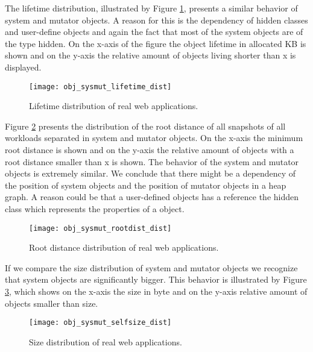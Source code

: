 The lifetime distribution, illustrated by Figure \ref{fig:obj_sysmut_lieftiem_dist}, presents a similar behavior of system and mutator objects. A reason for this is the dependency of hidden classes and user-define objects and again the fact that most of the system objects are of the type hidden. On the x-axis of the figure the object lifetime in allocated KB is shown and on the y-axis the relative amount of objects living shorter than x is displayed. 
\begin{figure}
	\centering
	\texttt{[image: obj\_sysmut\_lifetime\_dist]}
	\caption{Lifetime distribution of real web applications.}
	\label{fig:obj_sysmut_lieftiem_dist}
\end{figure}

Figure \ref{fig:obj_sysmut_rootdist_dist} presents the distribution of the root distance of all snapshots of all workloads separated in system and mutator objects. On the x-axis the minimum root distance is shown and on the y-axis the relative amount of objects with a root distance smaller than x is shown. The behavior of the system and mutator objects is extremely similar. We conclude that there might be a dependency of the position of system objects and the position of mutator objects in a heap graph. A reason could be that a user-defined objects has a reference the hidden class which represents the properties of a object.  
\begin{figure}
	\centering
	\texttt{[image: obj\_sysmut\_rootdist\_dist]}
	\caption{Root distance distribution of real web applications.}
	\label{fig:obj_sysmut_rootdist_dist}
\end{figure}

If we compare the size distribution of system and mutator objects we recognize that system objects are significantly bigger. This behavior is illustrated by Figure \ref{fig:obj_sysmut_selfsize_dist}, which shows on the x-axis the size in byte and on the y-axis relative amount of objects smaller than size.
\begin{figure}
	\centering
	\texttt{[image: obj\_sysmut\_selfsize\_dist]}
	\caption{Size distribution of real web applications.}
	\label{fig:obj_sysmut_selfsize_dist}
\end{figure}